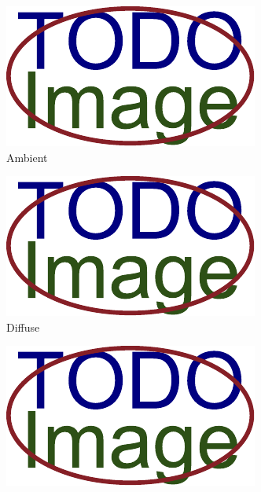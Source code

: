 \begin{figure}[H]
	\centering
	\begin{subfigure}{0.24\textwidth}
		\includegraphics[width=\textwidth]{obrazky-figures/placeholder.pdf}
		\caption{Ambient}
		\label{fig:opengl:phong:ambient}
	\end{subfigure}
	\hfill
	\begin{subfigure}{0.24\textwidth}
		\includegraphics[width=\textwidth]{obrazky-figures/placeholder.pdf}
		\caption{Diffuse}
		\label{fig:opengl:phong:diffuse}
	\end{subfigure}
	\hfill
	\begin{subfigure}{0.24\textwidth}
		\includegraphics[width=\textwidth]{obrazky-figures/placeholder.pdf}

\end{subfigure}
\end{figure}
